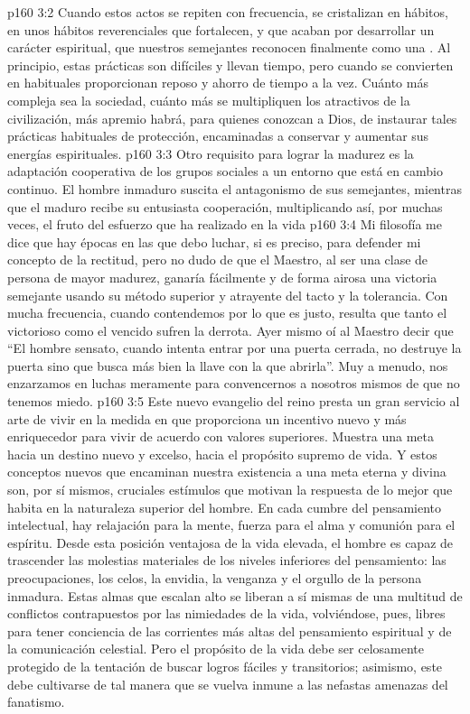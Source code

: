 \vs p160 3:2 Cuando estos actos se repiten con frecuencia, se cristalizan en hábitos, en unos hábitos reverenciales que fortalecen, y que acaban por desarrollar un carácter espiritual, que nuestros semejantes reconocen finalmente como una . Al principio, estas prácticas son difíciles y llevan tiempo, pero cuando se convierten en habituales proporcionan reposo y ahorro de tiempo a la vez. Cuánto más compleja sea la sociedad, cuánto más se multipliquen los atractivos de la civilización, más apremio habrá, para quienes conozcan a Dios, de instaurar tales prácticas habituales de protección, encaminadas a conservar y aumentar sus energías espirituales.
\vs p160 3:3 Otro requisito para lograr la madurez es la adaptación cooperativa de los grupos sociales a un entorno que está en cambio continuo. El hombre inmaduro suscita el antagonismo de sus semejantes, mientras que el maduro recibe su entusiasta cooperación, multiplicando así, por muchas veces, el fruto del esfuerzo que ha realizado en la vida
\vs p160 3:4 Mi filosofía me dice que hay épocas en las que debo luchar, si es preciso, para defender mi concepto de la rectitud, pero no dudo de que el Maestro, al ser una clase de persona de mayor madurez, ganaría fácilmente y de forma airosa una victoria semejante usando su método superior y atrayente del tacto y la tolerancia. Con mucha frecuencia, cuando contendemos por lo que es justo, resulta que tanto el victorioso como el vencido sufren la derrota. Ayer mismo oí al Maestro decir que “El hombre sensato, cuando intenta entrar por una puerta cerrada, no destruye la puerta sino que busca más bien la llave con la que abrirla”. Muy a menudo, nos enzarzamos en luchas meramente para convencernos a nosotros mismos de que no tenemos miedo.
\vs p160 3:5 Este nuevo evangelio del reino presta un gran servicio al arte de vivir en la medida en que proporciona un incentivo nuevo y más enriquecedor para vivir de acuerdo con valores superiores. Muestra una meta hacia un destino nuevo y excelso, hacia el propósito supremo de vida. Y estos conceptos nuevos que encaminan nuestra existencia a una meta eterna y divina son, por sí mismos, cruciales estímulos que motivan la respuesta de lo mejor que habita en la naturaleza superior del hombre. En cada cumbre del pensamiento intelectual, hay relajación para la mente, fuerza para el alma y comunión para el espíritu. Desde esta posición ventajosa de la vida elevada, el hombre es capaz de trascender las molestias materiales de los niveles inferiores del pensamiento: las preocupaciones, los celos, la envidia, la venganza y el orgullo de la persona inmadura. Estas almas que escalan alto se liberan a sí mismas de una multitud de conflictos contrapuestos por las nimiedades de la vida, volviéndose, pues, libres para tener conciencia de las corrientes más altas del pensamiento espiritual y de la comunicación celestial. Pero el propósito de la vida debe ser celosamente protegido de la tentación de buscar logros fáciles y transitorios; asimismo, este debe cultivarse de tal manera que se vuelva inmune a las nefastas amenazas del fanatismo.

